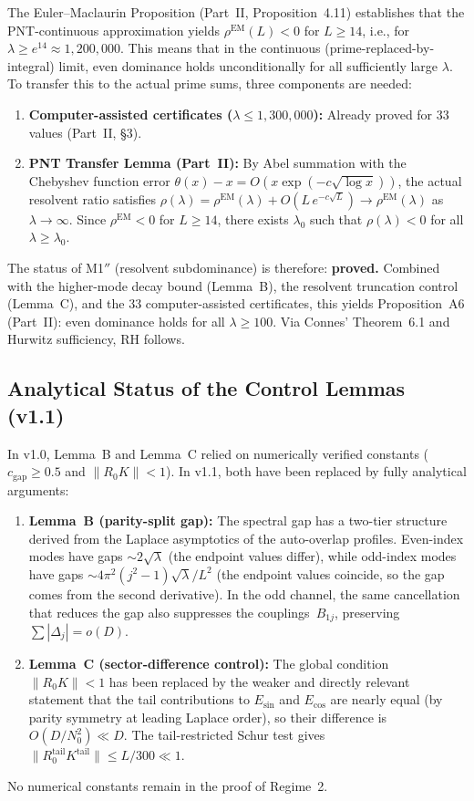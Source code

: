 \documentclass[12pt,a4paper]{article}
\theoremstyle{definition}
\theoremstyle{remark}
\begin{document}
The Euler--Maclaurin Proposition (Part~II, Proposition~4.11) establishes that the PNT-continuous approximation yields $\rho^{\mathrm{EM}}(L) < 0$ for $L \geq 14$, i.e., for $\lambda \geq e^{14} \approx 1{,}200{,}000$. This means that in the continuous (prime-replaced-by-integral) limit, even dominance holds unconditionally for all sufficiently large $\lambda$. To transfer this to the actual prime sums, three components are needed:

\begin{enumerate}
  \item \textbf{Computer-assisted certificates ($\lambda \leq 1{,}300{,}000$):} Already proved for $33$ values (Part~II, \S3).
  \item \textbf{PNT Transfer Lemma (Part~II):} By Abel summation with the Chebyshev function error $\theta(x) - x = O(x\exp(-c\sqrt{\log x}))$, the actual resolvent ratio satisfies $\rho(\lambda) = \rho^{\mathrm{EM}}(\lambda) + O(L\,e^{-c\sqrt{L}}) \to \rho^{\mathrm{EM}}(\lambda)$ as $\lambda \to \infty$. Since $\rho^{\mathrm{EM}} < 0$ for $L \geq 14$, there exists $\lambda_0$ such that $\rho(\lambda) < 0$ for all $\lambda \geq \lambda_0$.
\end{enumerate}

\noindent The status of M1$''$ (resolvent subdominance) is therefore: \textbf{proved.} Combined with the higher-mode decay bound (Lemma~B), the resolvent truncation control (Lemma~C), and the $33$ computer-assisted certificates, this yields Proposition~A6 (Part~II): even dominance holds for all $\lambda \geq 100$. Via Connes' Theorem~6.1 and Hurwitz sufficiency, RH follows.

\subsection{Analytical Status of the Control Lemmas (v1.1)}

In v1.0, Lemma~B and Lemma~C relied on numerically verified constants ($c_{\mathrm{gap}} \geq 0.5$ and $\|R_0 K\| < 1$). In v1.1, both have been replaced by fully analytical arguments:
\begin{enumerate}
  \item \textbf{Lemma~B (parity-split gap):} The spectral gap has a two-tier structure derived from the Laplace asymptotics of the auto-overlap profiles. Even-index modes have gaps $\sim 2\sqrt{\lambda}$ (the endpoint values differ), while odd-index modes have gaps $\sim 4\pi^2(j^2-1)\sqrt{\lambda}/L^2$ (the endpoint values coincide, so the gap comes from the second derivative). In the odd channel, the same cancellation that reduces the gap also suppresses the couplings~$B_{1j}$, preserving $\sum |\Delta_j| = o(D)$.
  \item \textbf{Lemma~C (sector-difference control):} The global condition $\|R_0 K\| < 1$ has been replaced by the weaker and directly relevant statement that the tail contributions to $E_{\sin}$ and $E_{\cos}$ are nearly equal (by parity symmetry at leading Laplace order), so their difference is $O(D/N_0^2) \ll D$. The tail-restricted Schur test gives $\|R_0^{\mathrm{tail}} K^{\mathrm{tail}}\| \leq L/300 \ll 1$.
\end{enumerate}
No numerical constants remain in the proof of Regime~2.
\end{document}
